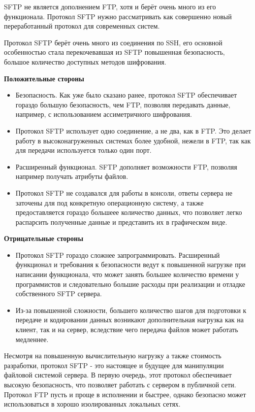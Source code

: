 \documentclass[a4paper,14pt]{extarticle}
\begin{document}
SFTP не является дополнением FTP, хотя и берёт очень много из его функционала. 
Протокол SFTP нужно рассматривать как совершенно новый переработанный протокол 
для современных систем.

Протокол SFTP берёт очень много из соединения по SSH, его основной особенностью
стала перекочевавшая из SFTP повышенная безопасность, большое количество доступных
методов шифрования. 

\textbf{Положительные стороны}\\
\begin{itemize}
\item Безопасность. Как уже было сказано ранее, протокол SFTP обеспечивает гораздо
большую безопасность, чем FTP, позволяя передавать данные, например, с использованием
ассиметричного шифрования.
\item Протокол SFTP использует одно соединение, а не два, как в FTP. Это делает работу
в высоконагруженных системах более удобной, нежели в FTP, так как для передачи используется
только один порт.
\item Расширенный функционал. SFTP дополняет возможности FTP, позволяя например 
получать атрибуты файлов. 
\item Протокол SFTP не создавался для работы в консоли, ответы сервера не заточены для 
под конкретную операционную систему, а также предоставляется гораздо большеее количество
данных, что позволяет легко распарсить полученные данные и представить их в графическом 
виде. 
\end{itemize}
\textbf{Отрицательные стороны}\\
\begin{itemize}
\item Протокол SFTP гораздо сложнее запрограммировать. Расширенный функционал
и требования к безопасности ведут к повышенной нагрузке при написании функционала, 
что может занять большее количество времени у программистов и следовательно
большие расходы при реализации и отладке собственного SFTP сервера.
\item Из-за повышенной сложности, большего количество шагов для подготовки к передаче
и кодировании данных возникают дополнительная нагрузка как на клиент, так и на сервер,
вследствие чего передача файлов может работать медленнее. 
\end{itemize}

Несмотря на повышенную вычислительную нагрузку а также стоимость разработки, 
протокол SFTP - это настоящее и будущее для манипуляции файловой системой сервера.
В первую очередь, этот протокол обеспечивает высокую безопасность, что позволяет 
работать с сервером в публичной сети. Протокол FTP пусть и проще в исполнении и быстрее, 
однако безопасно может использоваться в хорошо изолированных локальных сетях.
\end{document}
